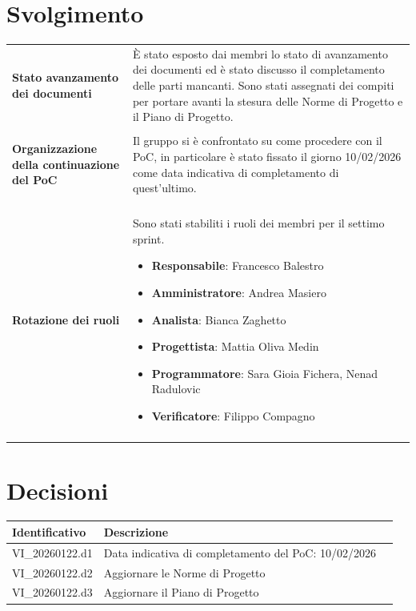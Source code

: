 \documentclass[a4paper,12pt]{article}
\begin{document}
    \section{Svolgimento} {
        \begin{longtable}{P{5cm}|P{10cm}} 
            \textbf{Stato avanzamento dei documenti} & 
            È stato esposto dai membri lo stato di avanzamento dei documenti ed è stato discusso il completamento delle parti mancanti. Sono stati assegnati dei compiti per portare avanti la stesura delle Norme di Progetto e il Piano di Progetto.\\\\
            \textbf{Organizzazione della continuazione del PoC} & Il gruppo si è confrontato su come procedere con il PoC, in particolare è stato fissato il giorno 10/02/2026 come data indicativa di completamento di quest'ultimo.\\\\
            \textbf{Rotazione dei ruoli} & Sono stati stabiliti i ruoli dei membri per il settimo sprint.
            \begin{itemize}
                \item \textbf{Responsabile}: Francesco Balestro
                \item \textbf{Amministratore}: Andrea Masiero
                \item \textbf{Analista}: Bianca Zaghetto
                \item \textbf{Progettista}: Mattia Oliva Medin
                \item \textbf{Programmatore}: Sara Gioia Fichera, Nenad Radulovic
                \item \textbf{Verificatore}: Filippo Compagno
            \end{itemize}\\\\
        \end{longtable}
    }

    \section{Decisioni} {
        \begin{tabularx}{\textwidth}{|l|X|l|}
            \hline
            \textbf{Identificativo} & \textbf{Descrizione}\\
            \hline
            VI\_20260122.d1 & Data indicativa di completamento del PoC: 10/02/2026\\
            \hline
            VI\_20260122.d2 & Aggiornare le Norme di Progetto\\
            \hline
            VI\_20260122.d3 & Aggiornare il Piano di Progetto\\
            \hline
        \end{tabularx}
    }
\end{document}
